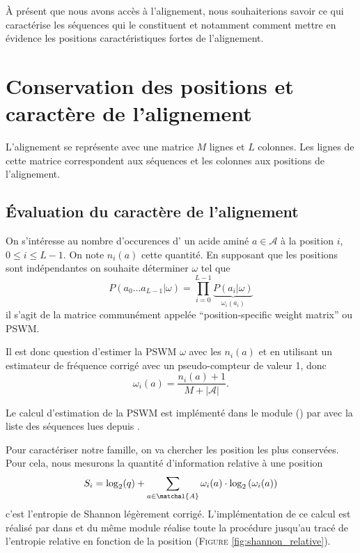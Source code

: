 \documentclass[a4paper, french]{article}
\begin{document}
\`A pr\'esent que nous avons acc\`es \`a l'alignement, nous souhaiterions
savoir ce qui caract\'erise les s\'equences qui le constituent et notamment
comment mettre en \'evidence les positions caract\'eristiques fortes de
l'alignement.

\section{Conservation des positions et caract\`ere de l'alignement}

L'alignement se repr\'esente avec une matrice $M$ lignes et $L$ colonnes.
Les lignes de cette matrice correspondent aux s\'equences et les colonnes
aux positions de l'alignement.

\subsection{\'Evaluation du caract\`ere de l'alignement}
On s'int\'eresse au nombre d'occurences d'%
un acide amin\'e $a\in\mathcal{A}$ \`a la  position $i$, $0\leq i\leq L-1$.
On note $n_i(a)$ cette quantit\'e. En supposant que les positions sont
ind\'ependantes on souhaite d\'eterminer $\omega$ tel que
\begin{equation*}
    P(a_0\ldots a_{L-1}|\omega)=
    \prod_{i=0}^{L-1} \underbrace{P(a_i|\omega)}_{\omega_i(a_i)}
\end{equation*}
il s'agit de la matrice commun\'ement appel\'ee
``position-specific weight matrix'' ou PSWM.

Il est donc question d'estimer la PSWM $\omega$ avec les $n_i(a)$ et en
utilisant un estimateur de fr\'equence corrig\'e avec un pseudo-compteur
de valeur 1, donc
\begin{equation*}
    \omega_i(a) = \frac{n_i(a) + 1}{M+|\mathcal{A}|}.
    \label{eq:estimateur_pswm}
\end{equation*}

Le calcul d'estimation de la PSWM est impl\'ement\'e dans le module
 () par\break
{} avec  la liste des
s\'equences lues depuis .

Pour caract\'eriser notre famille, on va chercher les position les plus
conserv\'ees. Pour cela, nous mesurons la quantit\'e d'information relative
\`a une position
\begin{equation*}
    S_i = \log_2(q) +
    \sum_{a\in\matchal{A}} \omega_i(a)
    \cdot
    \log_2\left(\omega_i(a)\right)
\end{equation*}
c'est l'entropie de Shannon l\'eg\`erement corrig\'e. L'impl\'ementation
de ce calcul est r\'ealis\'e par\break
{} dans
 et  du m\^eme module r\'ealise toute la
proc\'edure jusqu'au trac\'e de l'entropie relative en fonction de la
position (F\textsc{igure} \ref{fig:shannon_relative}).
\end{document}
